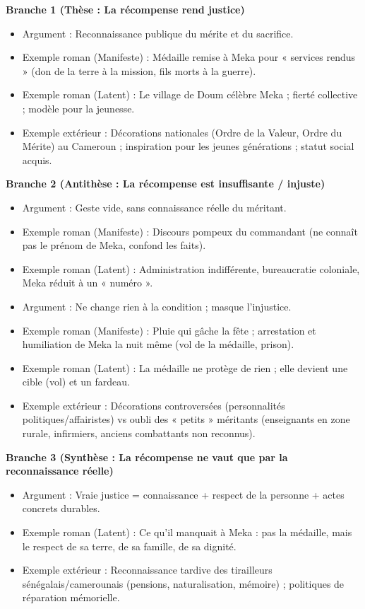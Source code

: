 \documentclass[11pt]{article}
\begin{document}
\begin{exemplebox}
\textbf{Branche 1 (Thèse : La récompense rend justice)}
\begin{itemize}
\item Argument : Reconnaissance publique du mérite et du sacrifice.
\item Exemple roman (Manifeste) : Médaille remise à Meka pour « services rendus » (don de la terre à la mission, fils morts à la guerre).
\item Exemple roman (Latent) : Le village de Doum célèbre Meka ; fierté collective ; modèle pour la jeunesse.
\item Exemple extérieur : Décorations nationales (Ordre de la Valeur, Ordre du Mérite) au Cameroun ; inspiration pour les jeunes générations ; statut social acquis.
\end{itemize}

\textbf{Branche 2 (Antithèse : La récompense est insuffisante / injuste)}
\begin{itemize}
\item Argument : Geste vide, sans connaissance réelle du méritant.
\item Exemple roman (Manifeste) : Discours pompeux du commandant (ne connaît pas le prénom de Meka, confond les faits).
\item Exemple roman (Latent) : Administration indifférente, bureaucratie coloniale, Meka réduit à un « numéro ».
\item Argument : Ne change rien à la condition ; masque l'injustice.
\item Exemple roman (Manifeste) : Pluie qui gâche la fête ; arrestation et humiliation de Meka la nuit même (vol de la médaille, prison).
\item Exemple roman (Latent) : La médaille ne protège de rien ; elle devient une cible (vol) et un fardeau.
\item Exemple extérieur : Décorations controversées (personnalités politiques/affairistes) vs oubli des « petits » méritants (enseignants en zone rurale, infirmiers, anciens combattants non reconnus).
\end{itemize}

\textbf{Branche 3 (Synthèse : La récompense ne vaut que par la reconnaissance réelle)}
\begin{itemize}
\item Argument : Vraie justice = connaissance + respect de la personne + actes concrets durables.
\item Exemple roman (Latent) : Ce qu'il manquait à Meka : pas la médaille, mais le respect de sa terre, de sa famille, de sa dignité.
\item Exemple extérieur : Reconnaissance tardive des tirailleurs sénégalais/camerounais (pensions, naturalisation, mémoire) ; politiques de réparation mémorielle.
\end{itemize}
\end{exemplebox}
\end{document}

